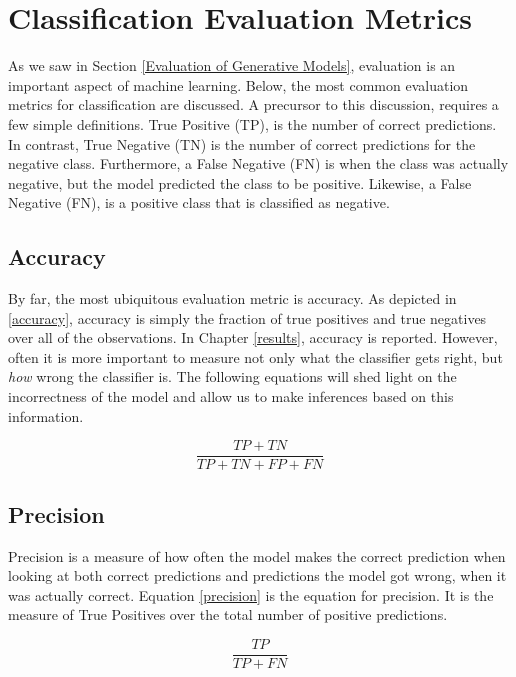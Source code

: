 \section{Classification Evaluation Metrics}
As we saw in Section \ref{Evaluation of Generative Models}, evaluation is an important aspect of machine learning. Below, the most common evaluation metrics for classification are discussed. A precursor to this discussion, requires a few simple definitions. True Positive (TP), is the number of correct predictions. In contrast, True Negative (TN) is the number of correct predictions for the negative class. Furthermore, a False Negative (FN) is when the class was actually negative, but the model predicted the class to be positive. Likewise, a False Negative (FN), is a positive class that is classified as negative.

\subsection{Accuracy}
By far, the most ubiquitous evaluation metric is accuracy. As depicted in \ref{accuracy}, accuracy is simply the fraction of true positives and true negatives over all of the observations. In Chapter \ref{results}, accuracy is reported. However, often it is more important to measure not only what the classifier gets right, but \textit{how} wrong the classifier is. The following equations will shed light on the incorrectness of the model and allow us to make inferences based on this information.
\begin{center}
    \begin{equation}
    \label{accuracy}
        \frac{TP+TN}{TP+TN+FP+FN}
    \end{equation}
\end{center}



\subsection{Precision}
Precision is a measure of how often the model makes the correct prediction when looking at both correct predictions and predictions the model got wrong, when it was actually correct. Equation \ref{precision} is the equation for precision. It is the measure of True Positives over the total number of positive predictions.
\begin{center}
    \begin{equation}
    \label{precision}
        \frac{TP}{TP+FN}
    \end{equation}
\end{center}

